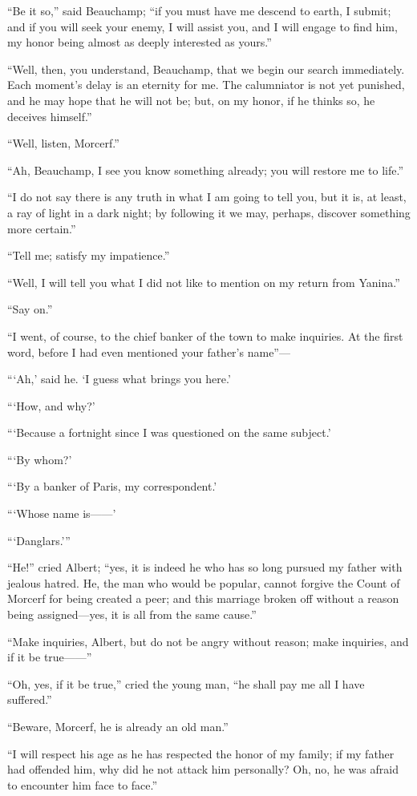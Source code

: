 “Be it so,” said Beauchamp; “if you must have me descend to earth, I
submit; and if you will seek your enemy, I will assist you, and I will
engage to find him, my honor being almost as deeply interested as
yours.”

“Well, then, you understand, Beauchamp, that we begin our search
immediately. Each moment’s delay is an eternity for me. The calumniator
is not yet punished, and he may hope that he will not be; but, on my
honor, if he thinks so, he deceives himself.”

“Well, listen, Morcerf.”

“Ah, Beauchamp, I see you know something already; you will restore me
to life.”

“I do not say there is any truth in what I am going to tell you, but it
is, at least, a ray of light in a dark night; by following it we may,
perhaps, discover something more certain.”

“Tell me; satisfy my impatience.”

“Well, I will tell you what I did not like to mention on my return from
Yanina.”

“Say on.”

“I went, of course, to the chief banker of the town to make inquiries.
At the first word, before I had even mentioned your father’s name”—

“‘Ah,’ said he. ‘I guess what brings you here.’

“‘How, and why?’

“‘Because a fortnight since I was questioned on the same subject.’

“‘By whom?’

“‘By a banker of Paris, my correspondent.’

“‘Whose name is——’

“‘Danglars.’”

“He!” cried Albert; “yes, it is indeed he who has so long pursued my
father with jealous hatred. He, the man who would be popular, cannot
forgive the Count of Morcerf for being created a peer; and this
marriage broken off without a reason being assigned—yes, it is all from
the same cause.”

“Make inquiries, Albert, but do not be angry without reason; make
inquiries, and if it be true——”

“Oh, yes, if it be true,” cried the young man, “he shall pay me all I
have suffered.”

“Beware, Morcerf, he is already an old man.”

“I will respect his age as he has respected the honor of my family; if
my father had offended him, why did he not attack him personally? Oh,
no, he was afraid to encounter him face to face.”

